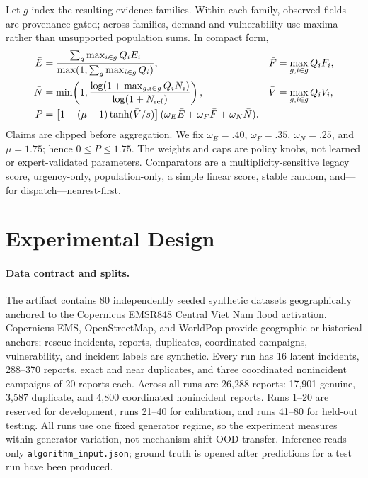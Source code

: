 \documentclass[runningheads]{llncs}
\begin{document}
Let $g$ index the resulting evidence families. Within each family, observed
fields are provenance-gated; across families, demand and vulnerability use
maxima rather than unsupported population sums. In compact form,
\begin{align}
\bar E&=\frac{\sum_g\max_{i\in g}Q_iE_i}
 {\max(1,\sum_g\max_{i\in g}Q_i)},&
\bar F&=\max_{g,i\in g}Q_iF_i,\nonumber\\
\bar N&=\min\!\left(1,\frac{\log(1+\max_{g,i\in g}Q_iN_i)}
 {\log(1+N_{\rm ref})}\right),&
\bar V&=\max_{g,i\in g}Q_iV_i,\nonumber\\
P&=\left[1+(\mu-1)\tanh(\bar V/s)\right]
 (\omega_E\bar E+\omega_F\bar F+\omega_N\bar N).
\label{eq:priority}
\end{align}
Claims are clipped before aggregation. We fix $\omega_E=.40$,
$\omega_F=.35$, $\omega_N=.25$, and $\mu=1.75$; hence
$0\le P\le1.75$. The weights and caps are policy knobs, not learned or
expert-validated parameters. Comparators are a multiplicity-sensitive legacy
score, urgency-only, population-only, a simple linear score, stable random,
and---for dispatch---nearest-first.

\section{Experimental Design}

\paragraph{Data contract and splits.}
The artifact contains 80 independently seeded synthetic datasets
geographically anchored to the Copernicus EMSR848 Central Viet Nam flood
activation. Copernicus EMS, OpenStreetMap, and WorldPop provide geographic or
historical anchors; rescue incidents, reports, duplicates, coordinated
campaigns, vulnerability, and incident labels are synthetic. Every run has 16
latent incidents, 288--370 reports, exact and near duplicates, and three
coordinated nonincident campaigns of 20 reports each. Across all runs are
26,288 reports: 17,901 genuine, 3,587 duplicate, and 4,800 coordinated
nonincident reports. Runs 1--20 are reserved for development, runs 21--40 for
calibration, and runs 41--80 for held-out testing. All runs use one fixed
generator regime, so the experiment measures within-generator variation, not
mechanism-shift OOD transfer. Inference reads only
\texttt{algorithm\_input.json}; ground truth is opened after predictions for a
test run have been produced.
\end{document}
